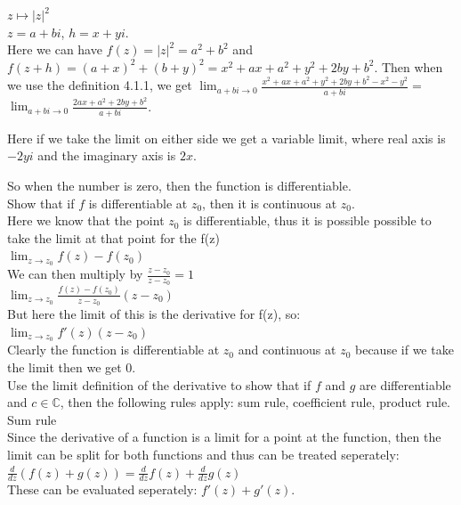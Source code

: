 \documentclass[12pt]{article}
\begin{document}
 $z \mapsto |z|^2$\\

$z = a + bi$, $h = x + yi$.\\

Here we can have $f(z) = |z|^2 = a^2+b^2$ and $f(z+h) = (a+x)^2 + (b+y)^2 = x^2 + ax + a^2 + y^2 + 2by + b^2$.
Then when we use the definition 4.1.1, we get $\lim_{a+bi \to 0}\frac{x^2 + ax + a^2 + y^2 + 2by + b^2 - x^2 - y^2}{a+bi} =$
$\lim_{a+bi \to 0} \frac{2ax + a^2 + 2by + b^2}{a+bi}$.

Here if we take the limit on either side we get a variable limit, where real axis is $-2yi$ and the imaginary axis is $2x$. 

So when the number is zero, then the function is differentiable.\\


 Show that if $f$ is differentiable at $z_0$, then it is continuous at $z_0$.\\

Here we know that the point $z_0$ is differentiable, thus it is possible possible to take the limit at that point for the f(z)\\
$\lim_{z\to z_0} f(z) - f(z_0)$\\
We can then multiply by $\frac{z - z_0}{z - z_0} = 1$\\
$\lim_{z\to z_0} \frac{f(z) - f(z_0)}{z-z_0} (z-z_0)$\\
But here the limit of this is the derivative for f(z), so: \\
$\lim_{z\to z_0} f'(z)(z - z_0)$\\
Clearly the function is differentiable at $z_0$ and continuous at $z_0$ because if we take the limit then we get 0.\\


 Use the limit definition of the derivative to show that if $f$ and $g$ are differentiable and $c \in \mathbb{C}$, then the following rules apply: sum rule, coefficient rule, product rule.\\

 Sum rule\\
Since the derivative of a function is a limit for a point at the function, then the limit can be split for both functions and thus can be treated seperately:\\
$\frac{d}{dz}(f(z) + g(z)) = \frac{d}{dz} f(z) + \frac{d}{dz} g(z)$\\
These can be evaluated seperately: $f'(z) + g'(z)$.\\
\end{document}
